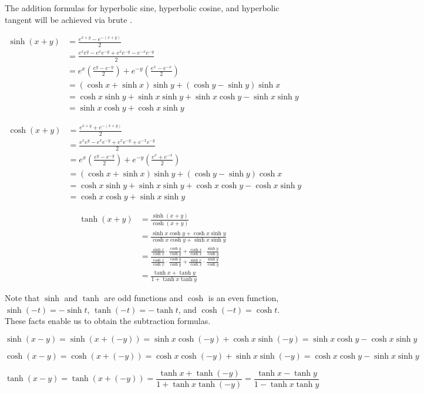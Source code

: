 \documentclass[12pt]{article}
\newcommand{\ds}{\displaystyle}
\begin{document}
The addition formulas for hyperbolic sine, hyperbolic cosine, and hyperbolic tangent will be achieved via brute .

\begin{align*}
\sinh(x+y) & =\frac{e^{x+y}-e^{-(x+y)}}{2} \\
& =\frac{e^xe^y-e^xe^{-y}+e^xe^{-y}-e^{-x}e^{-y}}{2} \\
& =e^x\left(\frac{e^y-e^{-y}}{2}\right)+e^{-y}\left(\frac{e^x-e^{-x}}{2}\right) \\
& =(\cosh x+\sinh x)\sinh y+(\cosh y-\sinh y)\sinh x \\
& =\cosh x\sinh y+\sinh x\sinh y+\sinh x\cosh y-\sinh x\sinh y \\
& =\sinh x\cosh y+\cosh x\sinh y
\end{align*}

\begin{align*}
\cosh(x+y) & =\frac{e^{x+y}+e^{-(x+y)}}{2} \\
& =\frac{e^xe^y-e^xe^{-y}+e^xe^{-y}+e^{-x}e^{-y}}{2} \\
& =e^x\left(\frac{e^y-e^{-y}}{2}\right)+e^{-y}\left(\frac{e^x+e^{-x}}{2}\right) \\
& =(\cosh x+\sinh x)\sinh y+(\cosh y-\sinh y)\cosh x \\
& =\cosh x\sinh y+\sinh x\sinh y+\cosh x\cosh y-\cosh x\sinh y \\
& =\cosh x\cosh y+\sinh x\sinh y
\end{align*}

\begin{align*}
\tanh(x+y) & =\frac{\sinh(x+y)}{\cosh(x+y)} \\
& =\frac{\sinh x\cosh y+\cosh x\sinh y}{\cosh x\cosh y+\sinh x\sinh y} \\
& =\frac{\ds\frac{\sinh x}{\cosh x} \cdot \frac{\cosh y}{\cosh y}+\frac{\cosh x}{\cosh x} \cdot \frac{\sinh y}{\cosh y}}
        {\ds\frac{\cosh x}{\cosh x} \cdot \frac{\cosh y}{\cosh y}+\frac{\sinh x}{\cosh x} \cdot \frac{\sinh y}{\cosh y}} \\
& =\frac{\tanh x+\tanh y}{1+\tanh x\tanh y}
\end{align*}

Note that $\sinh$ and $\tanh$ are odd functions and $\cosh$ is an even function,  $\sinh(-t)=-\sinh t$, $\tanh(-t)=-\tanh t$, and $\cosh(-t)=\cosh t$.  These facts enable us to obtain the subtraction formulas.

\[
\sinh(x-y)=\sinh(x+(-y))=\sinh x\cosh(-y)+\cosh x\sinh(-y)=\sinh x\cosh y-\cosh x\sinh y
\]

\[
\cosh(x-y)=\cosh(x+(-y))=\cosh x\cosh(-y)+\sinh x\sinh(-y)=\cosh x\cosh y-\sinh x\sinh y
\]

\[
\tanh(x-y)=\tanh(x+(-y))=\frac{\tanh x+\tanh(-y)}{1+\tanh x\tanh(-y)}=\frac{\tanh x-\tanh y}{1-\tanh x\tanh y}
\]
\end{document}
